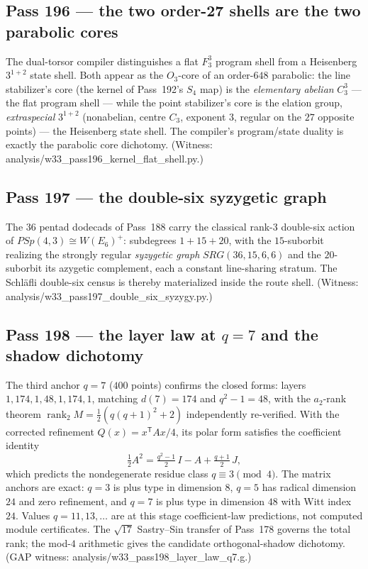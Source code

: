 \documentclass[12pt,a4paper]{article}
\def\mathbb#1{#1}%
\def\mathrm#1{#1}%
\def\texttt#1{#1}%
\theoremstyle{definition}
\newcommand{\SRG}{\mathrm{SRG}}
\newcommand{\PSp}{\mathrm{PSp}}
\begin{document}
\subsection{Pass 196 --- the two order-27 shells are the two parabolic
cores}
\label{ssec:pass196}

The dual-torsor compiler distinguishes a flat $\mathbb F_3^3$ program
shell from a Heisenberg $3^{1+2}$ state shell. Both appear as the
$O_3$-core of an order-$648$ parabolic: the line stabilizer's core (the
kernel of Pass~192's $S_4$ map) is the \emph{elementary abelian} $C_3^3$
--- the flat program shell --- while the point stabilizer's core is the
elation group, \emph{extraspecial} $3^{1+2}$ (nonabelian, centre $C_3$,
exponent $3$, regular on the $27$ opposite points) --- the Heisenberg
state shell. The compiler's program/state duality is exactly the
parabolic core dichotomy. (Witness:
\texttt{analysis/w33\_pass196\_kernel\_flat\_shell.py}.)

\subsection{Pass 197 --- the double-six syzygetic graph}
\label{ssec:pass197}

The $36$ pentad dodecads of Pass~188 carry the classical rank-$3$
double-six action of $\PSp(4,3)\cong W(E_6)^+$: subdegrees $1+15+20$,
with the $15$-suborbit realizing the strongly regular
\emph{syzygetic graph} $\SRG(36,15,6,6)$ and the $20$-suborbit its
azygetic complement, each a constant line-sharing stratum. The
Schl\"afli double-six census is thereby materialized inside the route
shell. (Witness:
\texttt{analysis/w33\_pass197\_double\_six\_syzygy.py}.)

\subsection{Pass 198 --- the layer law at \texorpdfstring{$q=7$}{q=7} and
the shadow dichotomy}
\label{ssec:pass198}

The third anchor $q=7$ ($400$ points) confirms the closed forms: layers
$1,174,1,48,1,174,1$, matching $d(7)=174$ and $q^2-1=48$, with the
$a_2$-rank theorem $\operatorname{rank}_2M=\tfrac12(q(q+1)^2+2)$
independently re-verified.  With the corrected refinement
$Q(x)=x^{\mathsf T}Ax/4$, its polar form satisfies the coefficient identity
\[
  \tfrac12A^2=\tfrac{q^2-1}2\,I-A+\tfrac{q+1}2\,J,
\]
which predicts the nondegenerate residue class $q\equiv3\pmod4$.  The
matrix anchors are exact: $q=3$ is plus type in dimension $8$, $q=5$ has
radical dimension $24$ and zero refinement, and $q=7$ is plus type in
dimension $48$ with Witt index $24$.  Values $q=11,13,\ldots$ are at this
stage coefficient-law predictions, not computed module certificates.  The
$\sqrt{17}$ Sastry--Sin transfer of Pass~178 governs the total rank; the
mod-$4$ arithmetic gives the candidate orthogonal-shadow dichotomy. (GAP
witness: \texttt{analysis/w33\_pass198\_layer\_law\_q7.g}.)
\end{document}
